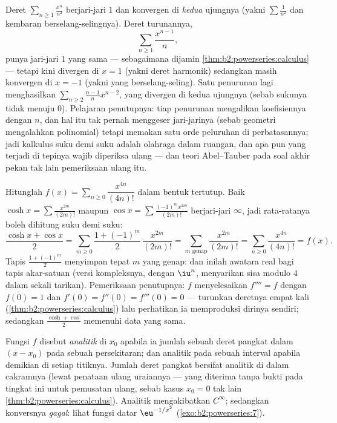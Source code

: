 \begin{example}\label{ex:b2:powerseries:boundaryloss}
Deret $\sum_{n\geq1}\frac{x^n}{n^2}$ berjari-jari $1$ dan
konvergen di \emph{kedua} ujungnya (yakni $\sum\frac1{n^2}$ dan
kembaran berselang-selingnya). Deret turunannya,
\[
\sum_{n\geq1}\frac{x^{n-1}}{n} ,
\]
punya jari-jari $1$ yang sama --- sebagaimana dijamin
\cref{thm:b2:powerseries:calculus} --- tetapi kini
divergen di $x = 1$ (yakni deret harmonik) sedangkan masih konvergen
di $x = -1$ (yakni yang berselang-seling). Satu penurunan lagi
menghasilkan $\sum_{n\geq2}\frac{n-1}{n}x^{n-2}$, yang divergen di
kedua ujungnya (sebab sukunya tidak menuju $0$). Pelajaran penutupnya:
tiap penurunan mengalikan koefisiennya dengan $n$, dan hal itu
tak pernah menggeser jari-jarinya (sebab geometri mengalahkan
polinomial) tetapi memakan satu orde peluruhan di perbatasannya; jadi
kalkulus suku demi suku adalah olahraga dalam ruangan, dan apa pun yang
terjadi di tepinya wajib diperiksa ulang --- dan teori Abel--Tauber pada
soal akhir pekan tak lain pemeriksaan ulang itu.
\end{example}

\begin{example}\label{ex:b2:powerseries:quarter}
Hitunglah $f(x) = \sum_{n\geq0} \dfrac{x^{4n}}{(4n)!}$ dalam bentuk
tertutup. Baik $\cosh x = \sum \frac{x^{2m}}{(2m)!}$ maupun $\cos x =
\sum \frac{(-1)^m x^{2m}}{(2m)!}$ berjari-jari $\infty$, jadi
rata-ratanya boleh dihitung suku demi suku:
\[
\frac{\cosh x + \cos x}{2}
= \sum_{m\geq0}\frac{1 + (-1)^m}{2}\,\frac{x^{2m}}{(2m)!}
= \sum_{m \text{ genap}}\frac{x^{2m}}{(2m)!}
= \sum_{n\geq0}\frac{x^{4n}}{(4n)!} = f(x) .
\]
Tapis $\frac{1+(-1)^m}{2}$ menyimpan tepat $m$ yang genap: dan inilah
awatara real bagi tapis akar-satuan (versi kompleksnya, dengan $\iu^n$,
menyarikan sisa modulo $4$ dalam sekali tarikan). Pemeriksaan
penutupnya: $f$ menyelesaikan $f'''' = f$ dengan $f(0) = 1$ dan
$f'(0) = f''(0) = f'''(0) = 0$ --- turunkan deretnya empat
kali (\cref{thm:b2:powerseries:calculus}) lalu perhatikan ia
memproduksi dirinya sendiri; sedangkan $\frac{\cosh + \cos}{2}$
memenuhi data yang sama.
\end{example}

\begin{definition}\label{def:b2:powerseries:analytic}
Fungsi $f$ disebut \emph{analitik} di $x_0$
apabila ia jumlah sebuah deret pangkat dalam $(x - x_0)$ pada sebuah
persekitaran; dan analitik pada sebuah interval apabila demikian di
setiap titiknya. Jumlah deret pangkat bersifat analitik
di dalam cakramnya (lewat penataan ulang uraiannya --- yang diterima
tanpa bukti pada tingkat ini untuk pemusatan ulang, sebab kasus $x_0 =
0$ tak lain \cref{thm:b2:powerseries:calculus}). Analitik mengakibatkan
$C^\infty$; sedangkan konversnya \emph{gagal}: lihat fungsi datar
$\eu^{-1/x^2}$ (\cref{exo:b2:powerseries:7}).
\end{definition}


